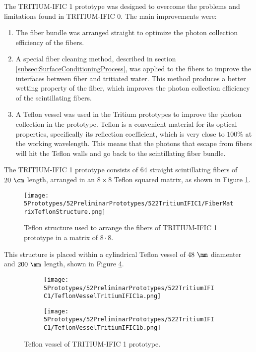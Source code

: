 The TRITIUM-IFIC 1 prototype was designed to overcome the problems and limitations found in TRITIUM-IFIC 0. The main improvements were:

\begin{enumerate}

\item{} The fiber bundle was arranged straight to optimize the photon collection efficiency of the fibers.

\item{} A special fiber cleaning method, described in section \ref{subsec:SurfaceConditioningProcess}, was applied to the fibers to improve the interfaces between fiber and tritiated water. This method produces a better wetting property of the fiber, which improves the photon collection efficiency of the scintillating fibers.

\item{} A Teflon vessel was used in the Tritium prototypes to improve the photon collection in the prototype. Teflon is a convenient material for its optical properties, specifically its reflection coefficient, which is very close to $100\%$ at the working wavelength. This means that the photons that escape from fibers will hit the Teflon walls and go back to the scintillating fiber bundle.

\end{enumerate}

The TRITIUM-IFIC 1 prototype consists of 64 straight scintillating fibers of $20~\cm$ length, arranged in an $8\times 8$ Teflon squared matrix, as shown in Figure \ref{fig:TeflonStructureFibersTritiumIFIC1}.

\begin{figure}[h]
\centering
\texttt{[image: 5Prototypes/52PreliminarPrototypes/522TritiumIFIC1/FiberMatrixTeflonStructure.png]}
\caption{Teflon structure used to arrange the fibers of TRITIUM-IFIC 1 prototype in a matrix of $8\cdot{}8$.\label{fig:TeflonStructureFibersTritiumIFIC1}}
\end{figure}
This structure is placed within a cylindrical Teflon vessel of $48~\mm$ diamenter and $200~\mm$ length, shown in Figure \ref{fig:TeflonVesselTritumIFIC1}. 

\begin{figure}
\centering
    \begin{subfigure}[b]{0.30\textwidth}
    \centering
    \texttt{[image: 5Prototypes/52PreliminarPrototypes/522TritiumIFIC1/TeflonVesselTritiumIFIC1a.png]}  
    \caption{\label{subfig:TeflonVesselTritumIFIC1a}}
    \end{subfigure}
    \hfill
    \begin{subfigure}[b]{0.45\textwidth}
    \centering
    \texttt{[image: 5Prototypes/52PreliminarPrototypes/522TritiumIFIC1/TeflonVesselTritiumIFIC1b.png]}  
    \caption{\label{subfig:TeflonVesselTritumIFIC1b}}
    \end{subfigure}
 \caption{Teflon vessel of TRITIUM-IFIC 1 prototype.}
 \label{fig:TeflonVesselTritumIFIC1}
\end{figure}

